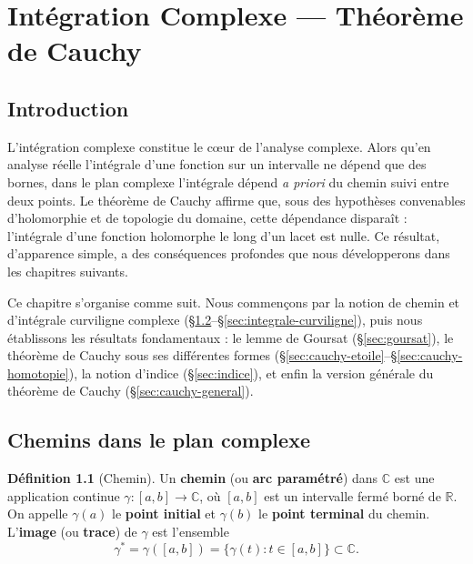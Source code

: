 \documentclass[12pt,a4paper,openany]{book}
\theoremstyle{definition}
\newtheorem{definition}{Définition}[chapter]
\theoremstyle{plain}
\theoremstyle{remark}
\newcommand{\C}{\mathbb{C}}
\newcommand{\R}{\mathbb{R}}
\begin{document}
\chapter{Intégration Complexe --- Théorème de Cauchy}\label{chap:integration-cauchy}

\section{Introduction}

L'intégration complexe constitue le cœur de l'analyse complexe. Alors qu'en
analyse réelle l'intégrale d'une fonction sur un intervalle ne dépend que des
bornes, dans le plan complexe l'intégrale dépend \emph{a priori} du chemin
suivi entre deux points. Le théorème de Cauchy affirme que, sous des
hypothèses convenables d'holomorphie et de topologie du domaine, cette
dépendance disparaît : l'intégrale d'une fonction holomorphe le long d'un
lacet est nulle. Ce résultat, d'apparence simple, a des conséquences
profondes que nous développerons dans les chapitres suivants.

Ce chapitre s'organise comme suit. Nous commençons par la notion de chemin
et d'intégrale curviligne complexe (\S\ref{sec:chemins}--\S\ref{sec:integrale-curviligne}),
puis nous établissons les résultats fondamentaux : le lemme de Goursat
(\S\ref{sec:goursat}), le théorème de Cauchy sous ses différentes formes
(\S\ref{sec:cauchy-etoile}--\S\ref{sec:cauchy-homotopie}), la notion d'indice
(\S\ref{sec:indice}), et enfin la version générale du théorème de Cauchy
(\S\ref{sec:cauchy-general}).

\section{Chemins dans le plan complexe}\label{sec:chemins}

\begin{definition}[Chemin]\label{def:chemin}
Un \textbf{chemin} (ou \textbf{arc paramétré}) dans $\C$ est une
application continue $\gamma \colon [a,b] \to \C$, où $[a,b]$ est un intervalle
fermé borné de $\R$. On appelle $\gamma(a)$ le \textbf{point initial} et
$\gamma(b)$ le \textbf{point terminal} du chemin. L'\textbf{image} (ou
\textbf{trace}) de $\gamma$ est l'ensemble
\[
  \gamma^* = \gamma([a,b]) = \{\gamma(t) : t \in [a,b]\} \subset \C.
\]
\end{definition}
\end{document}
